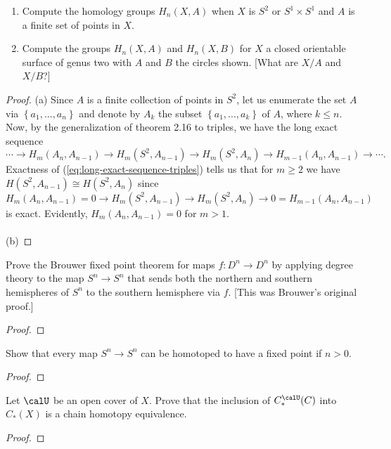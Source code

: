\begin{problem}[Hatcher {\S}2.1, Ex.\@ 17]
\begin{enumerate}[label=(\alph*)]
\item Compute the homology groups $H_n(X,A)$ when $X$ is $S^2$ or
  $S^1\times S^1$ and $A$ is a finite set of points in $X$.
\item Compute the groups $H_n(X,A)$ and $H_n(X,B)$ for $X$ a closed
  orientable surface of genus two with $A$ and $B$ the circles shown. [What
  are $X/A$ and $X/B$?]
\end{enumerate}
\end{problem}
\begin{proof}
(a) Since $A$ is a finite collection of points in $S^2$, let us enumerate
the set $A$ via $\left\{ a_1,...,a_n \right\}$ and denote by $A_k$ the
subset $\left\{a_1,...,a_k\right\}$ of $A$, where $k\leq n$. Now, by the
generalization of theorem 2.16 to triples, we have the long exact sequence
\begin{equation}
\label{eq:long-exact-sequence-triples}
\cdots\longrightarrow H_m(A_n,A_{n-1})\longrightarrow
H_m(S^2,A_{n-1})\longrightarrow H_m(S^2,A_n)
\longrightarrow H_{m-1}(A_n,A_{n-1})\longrightarrow\cdots.
\end{equation}
Exactness of (\ref{eq:long-exact-sequence-triples}) tells us that for
$m\geq 2$ we have $H(S^2,A_{n-1})\cong H(S^2,A_n)$ since
\[
H_m(A_n,A_{n-1})=0\longrightarrow H_m(S^2,A_{n-1})\longrightarrow
H_m(S^2,A_n)\longrightarrow 0=H_{m-1}(A_n,A_{n-1})
\]
is exact. Evidently, $H_m(A_n,A_{n-1})=0$ for $m>1$.
\\\\
(b)
\end{proof}
\newpage

\begin{problem}[Hatcher {\S}2.2, Ex.\@ 1]
Prove the Brouwer fixed point theorem for maps $f\colon D^n\to D^n$ by applying
degree theory to the map $S^n\to S^n$ that sends both the northern and
southern hemispheres of $S^n$ to the southern hemisphere via $f$. [This was
Brouwer’s original proof.]
\end{problem}
\begin{proof}
\end{proof}
\newpage

\begin{problem}[Hatcher {\S}2.2, Ex.\@ 6]
Show that every map $S^n\to S^n$ can be homotoped to have a fixed point
if $n>0$.
\end{problem}
\begin{proof}
\end{proof}
\newpage

\begin{problem}
Let $\calU$ be an open cover of $X$. Prove that the inclusion of
$C_*^{\calU}(C)$ into $C_*(X)$ is a chain homotopy equivalence.
\end{problem}
\begin{proof}
\end{proof}

